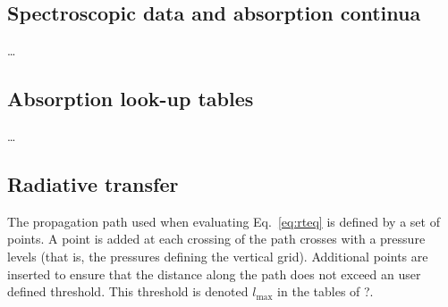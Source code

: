 \subsection{Spectroscopic data and absorption continua}
\label{sec:b:absdata}
%
\dots


\subsection{Absorption look-up tables}
\label{sec:b:abstable}
%
\dots



\subsection{Radiative transfer}
\label{sec:b:rt}
%
The propagation path used when evaluating Eq.~\ref{eq:rteq} is defined by a set
of points. A point is added at each crossing of the path crosses with a
pressure levels (that is, the pressures defining the vertical grid). Additional
points are inserted to ensure that the distance along the path does not exceed
an user defined threshold. This threshold is denoted $l_\mathrm{max}$ in the
tables of ?.
\\




